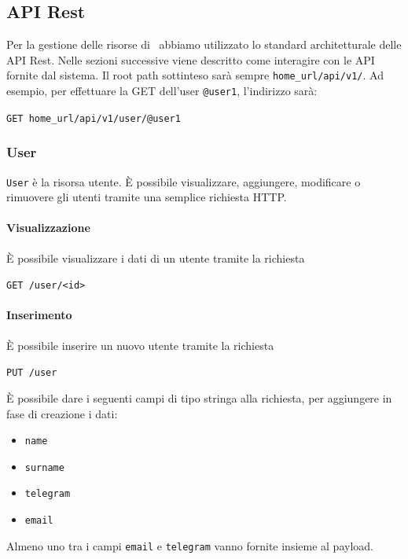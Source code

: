 \subsection{API Rest}\label{APIRest}
\newcommand{\homeUrl}{home\_url}

Per la gestione delle risorse di \progetto\ abbiamo utilizzato lo standard architetturale delle API Rest.
Nelle sezioni successive viene descritto come interagire con le API fornite dal sistema.
Il root path sottinteso sarà sempre \texttt{\homeUrl/api/v1/}.
Ad esempio, per effettuare la GET dell'user \texttt{@user1}, l'indirizzo sarà:
\begin{center}
    \texttt{GET \homeUrl/api/v1/user/@user1}
\end{center}

\subsubsection{User}

\texttt{User} è la risorsa utente.
È possibile visualizzare, aggiungere, modificare o rimuovere gli utenti tramite una semplice
richiesta HTTP.

\paragraph{Visualizzazione}
È possibile visualizzare i dati di un utente tramite la richiesta
    \begin{center}
        \texttt{GET  /user/<id>}
    \end{center}

\paragraph{Inserimento}
È possibile inserire un nuovo utente tramite la richiesta
    \begin{center}
        \texttt{PUT /user}
    \end{center}

È possibile dare i seguenti campi di tipo stringa alla richiesta, per aggiungere in fase di creazione i dati:
\begin{itemize}[noitemsep]
    \item \texttt{name}
    \item \texttt{surname}
    \item \texttt{telegram}
    \item \texttt{email}
\end{itemize}
Almeno uno tra i campi \texttt{email} e \texttt{telegram} vanno fornite insieme al payload.


